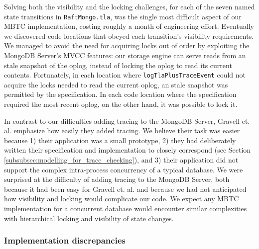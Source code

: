 \documentclass{vldb}
\begin{document}
Solving both the visibility and the locking challenges, for each of the seven named state transitions in \texttt{RaftMongo.tla}, was the single most difficult aspect of our MBTC implementation, costing roughly a month of engineering effort. 
Eventually we discovered code locations that obeyed each transition's visibility requirements.
We managed to avoid the need for acquiring locks out of order by exploiting the MongoDB Server's MVCC features: our storage engine can serve reads from an stale snapshot of the oplog, instead of locking the oplog to read its current contents.
Fortunately, in each location where \texttt{logTlaPlusTraceEvent} could not acquire the locks needed to read the current oplog, an stale snapshot was permitted by the specification.
In each code location where the specification required the most recent oplog, on the other hand, it was possible to lock it.


In contrast to our difficulties adding tracing to the MongoDB Server, Gravell et. al. \cite{Gravell11ConcurrentDevelopmentOfModelAndImplementation} emphasize how easily they added tracing.
We believe their task was easier because 1) their application was a small prototype, 2) they had deliberately written their specification and implementation to closely correspond (see Section \ref{subsubsec:modelling_for_trace_checking}), and 3) their application did not support the complex intra-process concurrency of a typical database.
We were surprised at the difficulty of adding tracing to the MongoDB Server, both because it had been easy for Gravell et. al. and because we had not anticipated how visibility and locking would complicate our code.
We expect any MBTC implementation for a concurrent database would encounter similar complexities with hierarchical locking and visibility of state changes.

\subsubsection{Implementation discrepancies}
\label{subsubsec:mbtc_impl_discrepencies}
\end{document}
